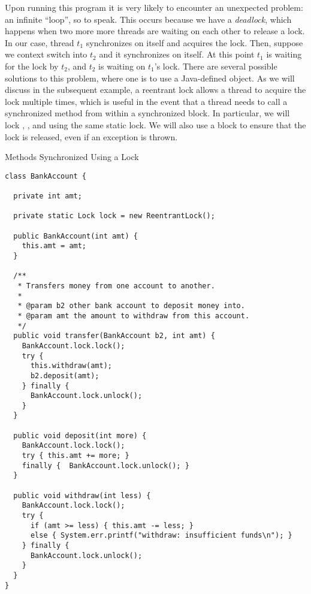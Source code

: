 Upon running this program it is very likely to encounter an unexpected problem: an infinite ``loop'', so to speak. This occurs because we have a \textit{deadlock}, which happens when two more more threads are waiting on each other to release a lock. In our case, thread $t_1$ synchronizes on itself and acquires the lock. Then, suppose we context switch into $t_2$ and it synchronizes on itself. At this point $t_1$ is waiting for the lock by $t_2$, and $t_2$ is waiting on $t_1$'s lock. There are several possible solutions to this problem, where one is to use a Java-defined  object. As we will discuss in the subsequent example, a reentrant lock allows a thread to acquire the lock multiple times, which is useful in the event that a thread needs to call a synchronized method from within a synchronized block. In particular, we will lock , , and  using the same static lock. We will also use a  block to ensure that the lock is released, even if an exception is thrown.

\begin{cl}{Methods Synchronized Using a Lock}
\begin{lstlisting}[language=MyJava]
class BankAccount {

  private int amt;

  private static Lock lock = new ReentrantLock();

  public BankAccount(int amt) {
    this.amt = amt;
  }

  /**
   * Transfers money from one account to another.
   *
   * @param b2 other bank account to deposit money into.
   * @param amt the amount to withdraw from this account.
   */
  public void transfer(BankAccount b2, int amt) {
    BankAccount.lock.lock();
    try {
      this.withdraw(amt);
      b2.deposit(amt);
    } finally {
      BankAccount.lock.unlock();
    }
  }

  public void deposit(int more) {
    BankAccount.lock.lock();
    try { this.amt += more; } 
    finally {  BankAccount.lock.unlock(); }
  }

  public void withdraw(int less) {
    BankAccount.lock.lock();
    try {
      if (amt >= less) { this.amt -= less; }
      else { System.err.printf("withdraw: insufficient funds\n"); }
    } finally {
      BankAccount.lock.unlock();
    }
  }
}
\end{lstlisting}
\end{cl}


